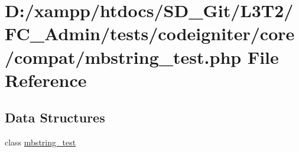 \hypertarget{_admin_2tests_2codeigniter_2core_2compat_2mbstring__test_8php}{}\section{D\+:/xampp/htdocs/\+S\+D\+\_\+\+Git/\+L3\+T2/\+F\+C\+\_\+\+Admin/tests/codeigniter/core/compat/mbstring\+\_\+test.php File Reference}
\label{_admin_2tests_2codeigniter_2core_2compat_2mbstring__test_8php}
\subsection*{Data Structures}
\begin{DoxyCompactItemize}
\item 
class \hyperlink{classmbstring__test}{mbstring\+\_\+test}
\end{DoxyCompactItemize}

